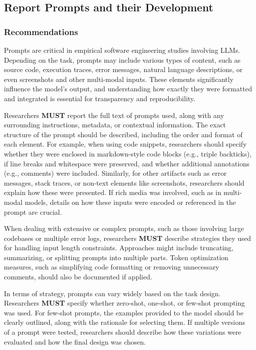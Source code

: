 \documentclass[11pt]{article}
\begin{document}
\subsection{Report Prompts and their Development}

\subsubsection{Recommendations}
Prompts are critical in empirical software engineering studies involving LLMs. Depending on the task, prompts may include various types of content, such as source code, execution traces, error messages, natural language descriptions, or even screenshots and other multi-modal inputs. These elements significantly influence the model’s output, and understanding how exactly they were formatted and integrated is essential for transparency and reproducibility.

Researchers \textbf{MUST} report the full text of prompts used, along with any surrounding instructions, metadata, or contextual information. The exact structure of the prompt should be described, including the order and format of each element. For example, when using code snippets, researchers should specify whether they were enclosed in markdown-style code blocks (e.g., triple backticks), if line breaks and whitespace were preserved, and whether additional annotations (e.g., comments) were included. Similarly, for other artifacts such as error messages, stack traces, or non-text elements like screenshots, researchers should explain how these were presented. If rich media was involved, such as in multi-modal models, details on how these inputs were encoded or referenced in the prompt are crucial.

When dealing with extensive or complex prompts, such as those involving large codebases or multiple error logs, researchers \textbf{MUST} describe strategies they used for handling input length constraints. Approaches might include truncating, summarizing, or splitting prompts into multiple parts. Token optimization measures, such as simplifying code formatting or removing unnecessary comments, should also be documented if applied.

In terms of strategy, prompts can vary widely based on the task design. Researchers \textbf{MUST} specify whether zero-shot, one-shot, or few-shot prompting was used. For few-shot prompts, the examples provided to the model should be clearly outlined, along with the rationale for selecting them. If multiple versions of a prompt were tested, researchers should describe how these variations were evaluated and how the final design was chosen.
\end{document}
